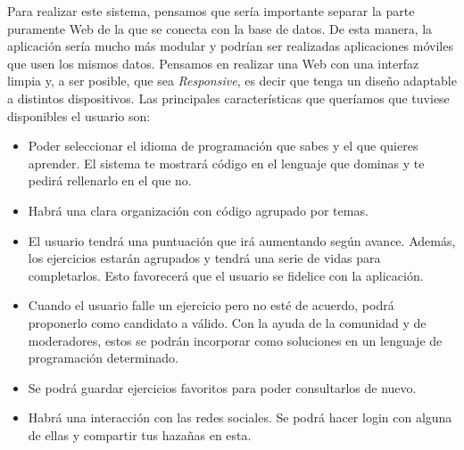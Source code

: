 Para realizar este sistema, pensamos que sería importante separar la parte puramente Web de la que se conecta con la base de datos. De esta manera, la aplicación sería mucho más modular y podrían ser realizadas aplicaciones móviles que usen los mismos datos. Pensamos en realizar una Web con una interfaz limpia y, a ser posible, que sea \emph{Responsive}, es decir que tenga un diseño adaptable a distintos dispositivos. Las principales características que queríamos que tuviese disponibles el usuario son:

\begin{itemize}
\item
Poder seleccionar el idioma de programación que sabes y el que quieres aprender. El sistema te mostrará código en el lenguaje que dominas y te pedirá rellenarlo en el que no.

\item
Habrá una clara organización con código agrupado por temas.

\item
El usuario tendrá una puntuación que irá aumentando según avance. Además, los ejercicios estarán agrupados y tendrá una serie de vidas para completarlos. Esto favorecerá  que el usuario se fidelice con la aplicación.

\item
Cuando el usuario falle un ejercicio pero no esté de acuerdo, podrá proponerlo como candidato a válido. Con la ayuda de la comunidad y de moderadores, estos se podrán incorporar como soluciones en un lenguaje de programación determinado.

\item
Se podrá guardar ejercicios favoritos para poder consultarlos de nuevo.

\item
Habrá una interacción con las redes sociales. Se podrá hacer login con alguna de ellas y compartir tus hazañas en esta.
\end{itemize}